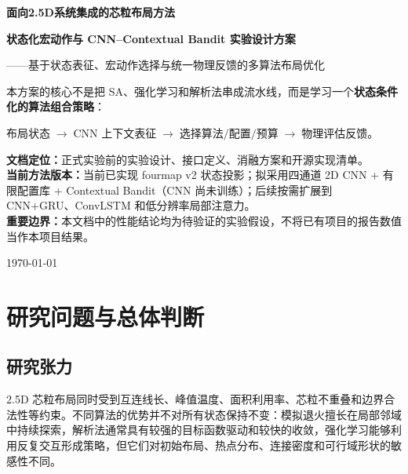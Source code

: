 \documentclass[UTF8,a4paper,11pt]{ctexart}
\newcommand{\important}[1]{\textbf{#1}}
\begin{document}
\begin{titlepage}
\centering
\vspace*{1.2cm}
{\LARGE\bfseries 面向2.5D系统集成的芯粒布局方法\par}
\vspace{0.35cm}
{\Huge\bfseries 状态化宏动作与 CNN--Contextual Bandit 实验设计方案\par}
\vspace{0.8cm}
{\Large ——基于状态表征、宏动作选择与统一物理反馈的多算法布局优化\par}
\vspace{1.2cm}
\begin{tcolorbox}[colback=lightblue,colframe=navy,width=0.92\textwidth,boxrule=0.7pt]
\centering
\large
本方案的核心不是把 SA、强化学习和解析法串成流水线，而是学习一个\important{状态条件化的算法组合策略}：\par
\vspace{0.2cm}
\(\text{布局状态}\;\longrightarrow\;\text{CNN 上下文表征}\;\longrightarrow\;\text{选择算法/配置/预算}\;\longrightarrow\;\text{物理评估反馈}\)。
\end{tcolorbox}
\vfill
\begin{flushleft}
\textbf{文档定位：}正式实验前的实验设计、接口定义、消融方案和开源实现清单。\\
\textbf{当前方法版本：}当前已实现 fourmap v2 状态投影；拟采用四通道 2D CNN + 有限配置库 + Contextual Bandit（CNN 尚未训练）；后续按需扩展到 CNN+GRU、ConvLSTM 和低分辨率局部注意力。\\
\textbf{重要边界：}本文档中的性能结论均为待验证的实验假设，不将已有项目的报告数值当作本项目结果。
\end{flushleft}
\vspace{0.8cm}
\today
\end{titlepage}

\tableofcontents
\newpage

\section{研究问题与总体判断}

\subsection{研究张力}

2.5D 芯粒布局同时受到互连线长、峰值温度、面积利用率、芯粒不重叠和边界合法性等约束。不同算法的优势并不对所有状态保持不变：模拟退火擅长在局部邻域中持续探索，解析法通常具有较强的目标函数驱动和较快的收敛，强化学习能够利用反复交互形成策略，但它们对初始布局、热点分布、连接密度和可行域形状的敏感性不同。
\end{document}
